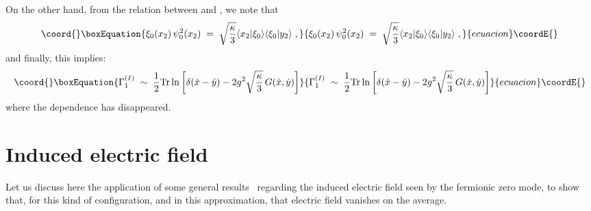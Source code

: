 \documentclass[a4paper,12pt]{article}
\begin{document}
On the other hand, from the relation between \coordHE{} and \coordHE{}, we note
that 
\begin{equation}\coord{}\boxEquation{
\xi_0 (x_2) \, \psi_0^2 (x_2) \;=\; \sqrt{\frac{\kappa}{3}} 
\langle x_2 | \xi_0 \rangle \langle \xi_0 | y_2 \rangle \;,
}{
\xi_0 (x_2) \, \psi_0^2 (x_2) \;=\; \sqrt{\frac{\kappa}{3}} 
\langle x_2 | \xi_0 \rangle \langle \xi_0 | y_2 \rangle \;,
}{ecuacion}\coordE{}\end{equation}  
and finally, this implies:
\begin{equation}\coord{}\boxEquation{
\Gamma_1^{(I)}\;\sim \; \frac{1}{2} {\rm Tr} \ln \left[ \delta({\hat x}-
{\hat y}) - 2 g^2 \sqrt{\frac{\kappa}{3}} \, G({\hat x},{\hat y}) \right]  
}{
\Gamma_1^{(I)}\;\sim \; \frac{1}{2} {\rm Tr} \ln \left[ \delta({\hat x}-
{\hat y}) - 2 g^2 \sqrt{\frac{\kappa}{3}} \, G({\hat x},{\hat y}) \right]  
}{ecuacion}\coordE{}\end{equation}
where the \coordHE{} dependence has disappeared.

\section{Induced electric field}\label{sec:el}
Let us discuss here the application of some general results~\cite{ffl}
regarding the induced electric field seen by the fermionic zero mode,
to show that, for this kind of configuration, and in this
approximation, that electric field vanishes on the average.
\end{document}
